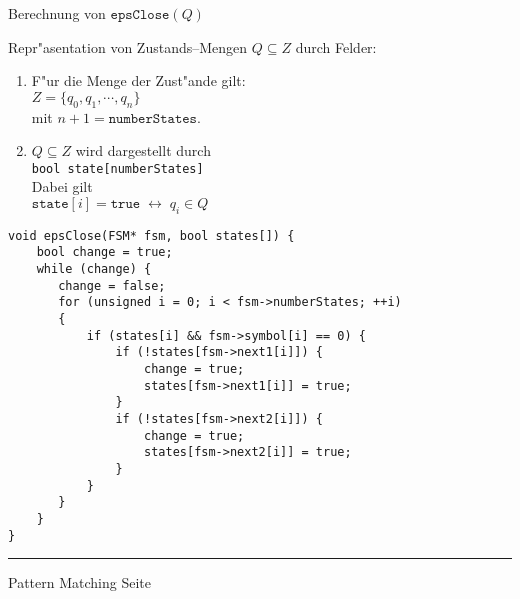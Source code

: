\begin{slide}{}
\normalsize

\begin{center}
Berechnung von $\mathtt{epsClose}(Q)$
\end{center}
\vspace*{0.5cm}

\footnotesize
Repr"asentation von Zustands--Mengen $Q \subseteq Z$ durch Felder:
\begin{enumerate}
\item F"ur die Menge der Zust"ande gilt: \\[0.3cm]
      \hspace*{1.3cm} $Z = \{q_0, q_1, \cdots, q_n \}$ \\[0.3cm]
      mit $n + 1 = \mathtt{numberStates}$.
\item $Q \subseteq Z$ wird dargestellt durch \\[0.3cm]
      \hspace*{1.3cm} \texttt{bool state[numberStates]}  \\[0.3cm]
      Dabei gilt \\[0.3cm]
      \hspace*{1.3cm} $\mathtt{state}[i] = \mathtt{true} \;\leftrightarrow\; q_i \in Q$
\end{enumerate}

\begin{verbatim}
void epsClose(FSM* fsm, bool states[]) {
    bool change = true;
    while (change) {
       change = false;
       for (unsigned i = 0; i < fsm->numberStates; ++i)
       {
           if (states[i] && fsm->symbol[i] == 0) {
               if (!states[fsm->next1[i]]) {
                   change = true;
                   states[fsm->next1[i]] = true;
               }
               if (!states[fsm->next2[i]]) {
                   change = true;
                   states[fsm->next2[i]] = true;
               }
           }
       }
    }
}
\end{verbatim}


\vspace*{\fill}
\tiny \addtocounter{mypage}{1}
\rule{17cm}{1mm}
Pattern Matching \hspace*{\fill} Seite 
\end{slide}



